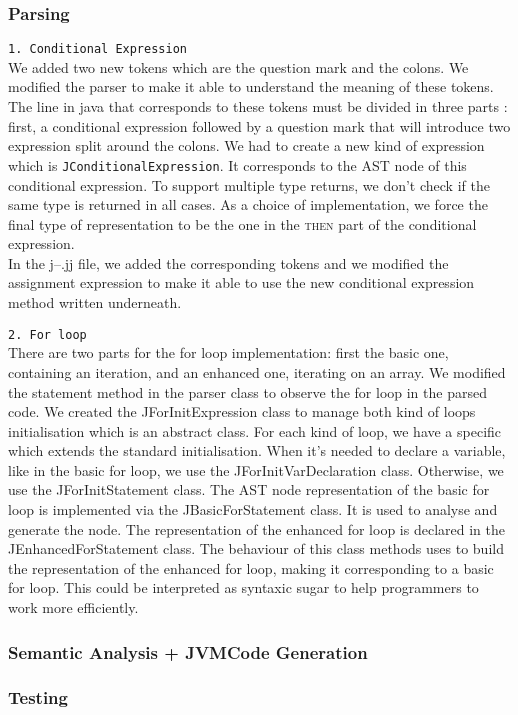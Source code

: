 \subsubsection{Parsing}
\texttt{1. Conditional Expression}\\
We added two new tokens which are the question mark and the colons. We modified the parser to make it able to understand the meaning of these tokens. The line in java that corresponds to these tokens must be divided in three parts : first, a conditional expression followed by a question mark that will introduce two expression split around the colons. We had to create a new kind of expression which is \texttt{JConditionalExpression}. It corresponds to the AST node of this conditional expression. To support multiple type returns, we don't check if the same type is returned in all cases. As a choice of implementation, we force the final type of representation to be the one in the \textsc{then} part of the conditional expression. \\

In the j--.jj file, we added the corresponding tokens and we modified the assignment expression to make it able to use the new conditional expression method written underneath. 

\texttt{2. For loop}\\
There are two parts for the for loop implementation: first the basic one, containing an iteration, and an enhanced one, iterating on an array. We modified the statement method in the parser class to observe the for loop in the parsed code. We created the JForInitExpression class to manage both kind of loops initialisation which is an abstract class. For each kind of loop, we have a specific which extends the standard initialisation. When it's needed to declare a variable, like in the basic for loop, we use the JForInitVarDeclaration class. Otherwise, we use the JForInitStatement class. The AST node representation of the basic for loop is implemented via the JBasicForStatement class. It is used to analyse and generate the node. The representation of the enhanced for loop is declared in the JEnhancedForStatement class. The behaviour of this class methods uses to build the representation of the enhanced for loop, making it corresponding to a basic for loop. This could be interpreted as syntaxic sugar to help programmers to work more efficiently. 


\subsubsection{Semantic Analysis + JVMCode Generation}

\subsubsection{Testing}




